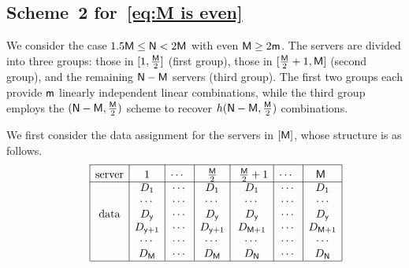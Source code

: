 \documentclass[conference,letterpaper]{IEEEtran}
\begin{document}

 
\subsection{\texorpdfstring{Scheme~2 for~\eqref{eq:M is even}}{Scheme 2 for Eq. (X)}}

\label{sub:M is even}

We consider the case \(1.5 {\sf M} \leq {\sf N} < 2 {\sf M}\) with even \({\sf M} \geq 2{\sf m}\). The servers are divided into three groups: those in \([1, \tfrac{{\sf M}}{2}]\) (first group), those in \([\tfrac{{\sf M}}{2}+1, {\sf M}]\) (second group), and the remaining \({\sf N} - {\sf M}\) servers (third group). The first two groups each provide \({\sf m}\) linearly independent linear combinations, while the third group employs the \(({\sf N} - {\sf M}, \tfrac{{\sf M}}{2})\) scheme to recover \(h({\sf N} - {\sf M}, \tfrac{{\sf M}}{2})\) combinations.



We first consider the data assignment for the servers in $[{\sf M}]$, whose structure is as follows.
\begin{align*}
\begin{array}{rl|c|c|c|c|c|c|c|}\cline{3-3}\cline{4-4}\cline{5-5}\cline{6-6}\cline{7-7}\cline{8-8}\cline{9-9}
&&\rule{0pt}{1.2em}\mbox{server}&\rule{0pt}{1.2em}\mbox{1} &\rule{0pt}{1.2em}\mbox{$\cdots$ } &  \rule{0pt}{1.2em}\mbox{ $\frac{\Msf}{2}$ } & \rule{0pt}{1.2em}\mbox{ $\frac{\Msf}{2}  +1$}&  \rule{0pt}{1.2em}\mbox{$\cdots$ } &  \rule{0pt}{1.2em}\mbox{$\Msf$ }\\ 
\cline{3-3}\cline{4-4}\cline{5-5}\cline{6-6}\cline{7-7}\cline{8-8}\cline{9-9}
&& &D_1 & \cdots & D_1 & D_1 & \cdots & D_1 \\
&& &\cdots & \cdots & \cdots & \cdots & \cdots & \cdots \\ 
&& \mbox{data}&D_{\ysf} & \cdots & D_{\ysf} & D_{\ysf} & \cdots & D_{\ysf} \\
&& &D_{\ysf+1} & \cdots & D_{\ysf+1} & D_{\Msf+1} & \cdots & D_{\Msf+1} \\ 
&& &\cdots & \cdots & \cdots & \cdots & \cdots & \cdots \\
&& &D_{\Msf} & \cdots & D_{\Msf}&  D_{\Nsf} & \cdots & D_{\Nsf}\\  
\cline{3-3}\cline{4-4}\cline{5-5}\cline{6-6}\cline{7-7}\cline{8-8}\cline{9-9}
\end{array}
\end{align*}
\end{document}
